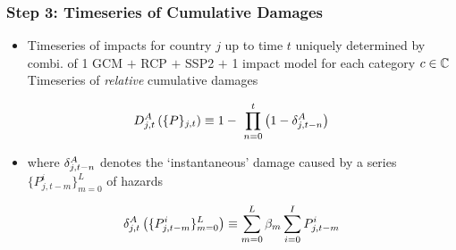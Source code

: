 \documentclass[
c,
11pt,
aspectratio=169, %
final,
]{beamer}
\begin{document}
\begin{frame}
  \frametitle{Step 3: Timeseries of Cumulative Damages}
  \begin{minipage}[l]{\linewidth}
        \begin{itemize}
  \item Timeseries of impacts  for country $j$ up to time $t$ uniquely determined by combi. of 1 GCM $+$ RCP $+$ SSP2 $+$ 1 impact model for each category $c\in\mathbb{C}$          
  \arrowitem Timeseries of \emph{relative} cumulative damages
  \end{itemize}
  \begin{equation*}
     \DA_{j,t}\left(\lbrace P\rbrace_{j,t}\right)\equiv 1 - \ \prod_{n=0}^{t}\left(1-\dA_{j,t-n}\right)
   \end{equation*}
   \vspace{-3ex}
   \begin{itemize}
\item  where $\delta^A_{j,t-n}$ denotes the `instantaneous' damage caused by a series $\lbrace P_{j,t-m}^i\rbrace_{m=0}^L$ of hazards   
   \end{itemize}
  \begin{equation*}
    \delta^A_{j,t}\left(\lbrace P_{j,t-m}^i\rbrace_{m=0}^L\right)\equiv \sum_{m=0}^L\beta_m\sum_{i=0}^IP_{j,t-m}^i
  \end{equation*}

\end{minipage}\hfill
\begin{minipage}[r]{0\linewidth}
\end{minipage}
\end{frame}
\end{document}
